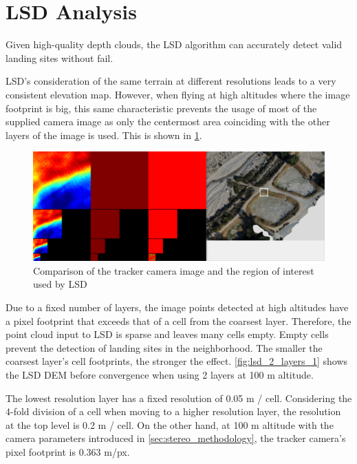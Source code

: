 \section{LSD Analysis}\label{sec:eval_LSD}

Given high-quality depth clouds, the LSD algorithm can accurately detect valid landing sites without fail.

LSD's consideration of the same terrain at different resolutions leads to a very consistent elevation map. However, when flying at high altitudes where the image footprint is big, this same characteristic prevents the usage of most of the supplied camera image as only the centermost area coinciding with the other layers of the image is used. This is shown in \cref{fig:LSD_center_usage}.

\begin{figure}[h]
\centering
\includegraphics[scale=0.14]{images/evaluation/LSD_center_usage.png}
\caption{Comparison of the tracker camera image and the region of interest used by LSD}
\label{fig:LSD_center_usage}
\end{figure}

Due to a fixed number of layers, the image points detected at high altitudes have a pixel footprint that exceeds that of a cell from the coarsest layer. Therefore, the point cloud input to LSD is sparse and leaves many cells empty. Empty cells prevent the detection of landing sites in the neighborhood. The smaller the coarsest layer's cell footprints, the stronger the effect. \cref{fig:lsd_2_layers_1} shows the LSD DEM before convergence when using 2 layers at 100 m altitude.

The lowest resolution layer has a fixed resolution of 0.05 m / cell. Considering the 4-fold division of a cell when moving to a higher resolution layer, the resolution at the top level is 0.2 m / cell. On the other hand, at 100 m altitude with the camera parameters introduced in \cref{sec:stereo_methodology}, the tracker camera's pixel footprint is 0.363 m/px. 

